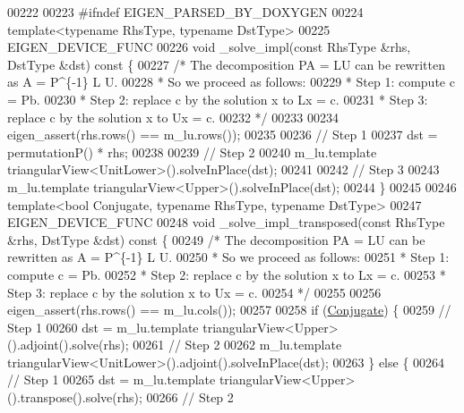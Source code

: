 \begin{DoxyCode}
00222 
00223 \textcolor{preprocessor}{    #ifndef EIGEN\_PARSED\_BY\_DOXYGEN}
00224     \textcolor{keyword}{template}<\textcolor{keyword}{typename} RhsType, \textcolor{keyword}{typename} DstType>
00225     EIGEN\_DEVICE\_FUNC
00226     \textcolor{keywordtype}{void} \_solve\_impl(\textcolor{keyword}{const} RhsType &rhs, DstType &dst)\textcolor{keyword}{ const }\{
00227      \textcolor{comment}{/* The decomposition PA = LU can be rewritten as A = P^\{-1\} L U.}
00228 \textcolor{comment}{      * So we proceed as follows:}
00229 \textcolor{comment}{      * Step 1: compute c = Pb.}
00230 \textcolor{comment}{      * Step 2: replace c by the solution x to Lx = c.}
00231 \textcolor{comment}{      * Step 3: replace c by the solution x to Ux = c.}
00232 \textcolor{comment}{      */}
00233 
00234       eigen\_assert(rhs.rows() == m\_lu.rows());
00235 
00236       \textcolor{comment}{// Step 1}
00237       dst = permutationP() * rhs;
00238 
00239       \textcolor{comment}{// Step 2}
00240       m\_lu.template triangularView<UnitLower>().solveInPlace(dst);
00241 
00242       \textcolor{comment}{// Step 3}
00243       m\_lu.template triangularView<Upper>().solveInPlace(dst);
00244     \}
00245 
00246     \textcolor{keyword}{template}<\textcolor{keywordtype}{bool} Conjugate, \textcolor{keyword}{typename} RhsType, \textcolor{keyword}{typename} DstType>
00247     EIGEN\_DEVICE\_FUNC
00248     \textcolor{keywordtype}{void} \_solve\_impl\_transposed(\textcolor{keyword}{const} RhsType &rhs, DstType &dst)\textcolor{keyword}{ const }\{
00249      \textcolor{comment}{/* The decomposition PA = LU can be rewritten as A = P^\{-1\} L U.}
00250 \textcolor{comment}{      * So we proceed as follows:}
00251 \textcolor{comment}{      * Step 1: compute c = Pb.}
00252 \textcolor{comment}{      * Step 2: replace c by the solution x to Lx = c.}
00253 \textcolor{comment}{      * Step 3: replace c by the solution x to Ux = c.}
00254 \textcolor{comment}{      */}
00255 
00256       eigen\_assert(rhs.rows() == m\_lu.cols());
00257 
00258       \textcolor{keywordflow}{if} (\hyperlink{class_eigen_1_1_conjugate}{Conjugate}) \{
00259         \textcolor{comment}{// Step 1}
00260         dst = m\_lu.template triangularView<Upper>().adjoint().solve(rhs);
00261         \textcolor{comment}{// Step 2}
00262         m\_lu.template triangularView<UnitLower>().adjoint().solveInPlace(dst);
00263       \} \textcolor{keywordflow}{else} \{
00264         \textcolor{comment}{// Step 1}
00265         dst = m\_lu.template triangularView<Upper>().transpose().solve(rhs);
00266         \textcolor{comment}{// Step 2}

\end{DoxyCode}
